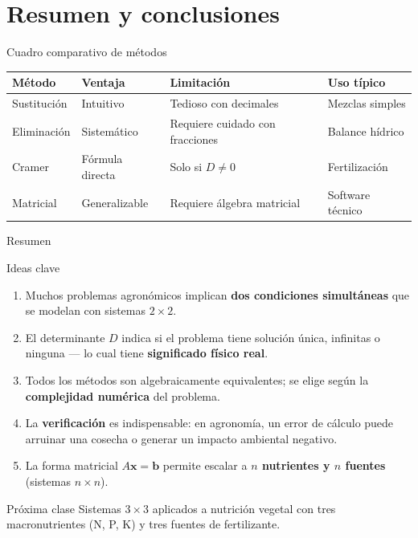 \documentclass[11pt, aspectratio=169]{beamer}
\begin{document}
	\section{Resumen y conclusiones}
	
	\begin{frame}{Cuadro comparativo de métodos}
		\begin{table}
			\centering
			\renewcommand{\arraystretch}{1.4}
			\begin{tabular}{llll}
				\toprule
				\textbf{Método} & \textbf{Ventaja} & \textbf{Limitación}
				& \textbf{Uso típico} \\
				\midrule
				Sustitución  & Intuitivo       & Tedioso con decimales
				& Mezclas simples \\
				Eliminación  & Sistemático     & Requiere cuidado con fracciones
				& Balance hídrico \\
				Cramer        & Fórmula directa & Solo si $D \neq 0$
				& Fertilización \\
				Matricial    & Generalizable   & Requiere álgebra matricial
				& Software técnico \\
				\bottomrule
			\end{tabular}
		\end{table}
	\end{frame}
	
	\begin{frame}{Resumen}
		\begin{block}{Ideas clave}
			\begin{enumerate}
				\item Muchos problemas agronómicos implican \textbf{dos condiciones simultáneas}
				que se modelan con sistemas $2\times2$.
				\item El determinante $D$ indica si el problema tiene solución única,
				infinitas o ninguna --- lo cual tiene \textbf{significado físico real}.
				\item Todos los métodos son algebraicamente equivalentes;
				se elige según la \textbf{complejidad numérica} del problema.
				\item La \textbf{verificación} es indispensable: en agronomía,
				un error de cálculo puede arruinar una cosecha o generar un impacto ambiental negativo.
				\item La forma matricial $A\mathbf{x}=\mathbf{b}$ permite escalar a
				\textbf{$n$ nutrientes y $n$ fuentes} (sistemas $n\times n$).
			\end{enumerate}
		\end{block}
		
		\vspace{0.3em}
		\begin{exampleblock}{Próxima clase}
			Sistemas $3\times3$ aplicados a nutrición vegetal con tres macronutrientes
			(N, P, K) y tres fuentes de fertilizante.
		\end{exampleblock}
	\end{frame}
	
\end{document}
